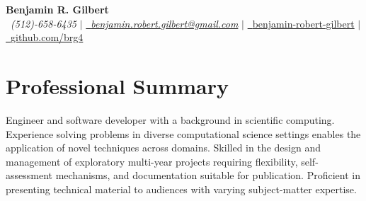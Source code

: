 \documentclass[letterpaper,10pt]{article}
\newcommand{\sectionspace}{
\vspace{-17pt}
}
\begin{document}

\begin{flushleft}
    \textbf{\Large Benjamin R. Gilbert} \\    
    \Mobilefone~\textcolor{color1}{\textit{(512)-658-6435}} {\large $|$}
    \href{mailto:benjamin.robert.gilbert@gmail.com}{{\Letter~\textcolor{color1}{\textit{benjamin.robert.gilbert@gmail.com}}}} {\large $|$}
    \href{https://www.linkedin.com/in/benjamin-robert-gilbert/}{\faLinkedin~\textcolor{color1}{benjamin-robert-gilbert}} {\large $|$}
    \href{https://github.com/brg4}{\Keyboard~\textcolor{color1}{github.com/brg4}} %
    \vspace{-8pt}
\end{flushleft}


\section{\textcolor{color1}{Professional Summary}}
\vspace{-3pt}
\begin{itemize}[leftmargin=0.15in, label={}]
    {\item{
        {Engineer and software developer with a background in scientific computing. Experience solving problems in diverse computational science settings enables the application of novel techniques across domains. Skilled in the design and management of exploratory multi-year projects requiring flexibility, self-assessment mechanisms, and documentation suitable for publication. Proficient in presenting technical material to audiences with varying subject-matter expertise.} \\      
    }}
 \end{itemize}
 \sectionspace
\end{document}
